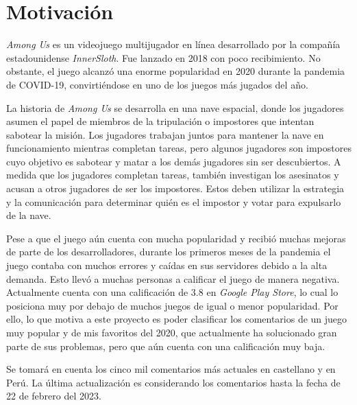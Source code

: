 



\maketitle


\section{Motivación}
\textit{Among Us} es un videojuego multijugador en línea desarrollado por la compañía estadounidense \textit{InnerSloth}. Fue lanzado en 2018 con poco recibimiento. No obstante, el juego alcanzó una enorme popularidad en 2020 durante la pandemia de COVID-19, convirtiéndose en uno de los juegos más jugados del año.

La historia de \textit{Among Us} se desarrolla en una nave espacial, donde los jugadores asumen el papel de miembros de la tripulación o impostores que intentan sabotear la misión. Los jugadores trabajan juntos para mantener la nave en funcionamiento mientras completan tareas, pero algunos jugadores son impostores cuyo objetivo es sabotear y matar a los demás jugadores sin ser descubiertos. A medida que los jugadores completan tareas, también investigan los asesinatos y acusan a otros jugadores de ser los impostores. Estos deben utilizar la estrategia y la comunicación para determinar quién es el impostor y votar para expulsarlo de la nave.

Pese a que el juego aún cuenta con mucha popularidad y recibió muchas mejoras de parte de los desarrolladores, durante los primeros meses de la pandemia el juego contaba con muchos errores y caídas en sus servidores debido a la alta demanda. Esto llevó a muchas personas a calificar el juego de manera negativa. Actualmente cuenta con una calificación de 3.8 en \textit{Google Play Store}, lo cual lo posiciona muy por debajo de muchos juegos de igual o menor popularidad. Por ello, lo que motiva a este proyecto es poder clasificar los comentarios de un juego muy popular y de mis favoritos del 2020, que actualmente ha solucionado gran parte de sus problemas, pero que aún cuenta con una calificación muy baja.

Se tomará en cuenta los cinco mil comentarios más actuales en castellano y en Perú. La última actualización es considerando los comentarios hasta la fecha de 22 de febrero del 2023.


